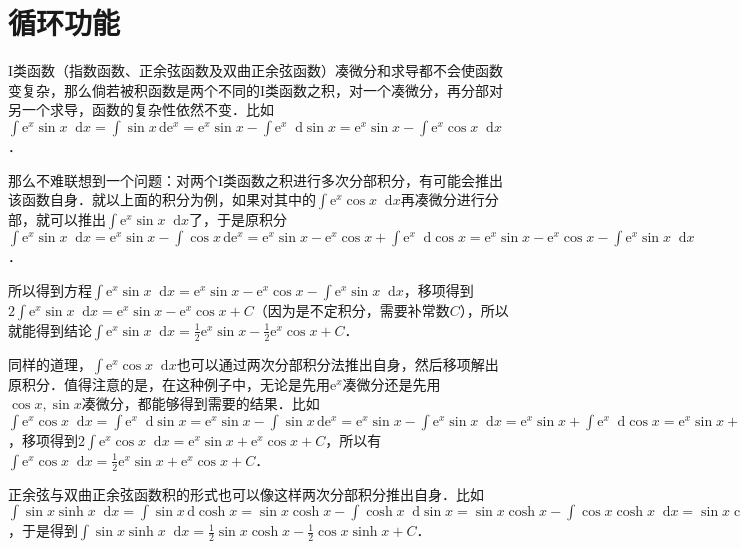 \documentclass{ctexbook}
\newcommand*{\dif}{\mathop{}\!\mathrm{d}}
\begin{document}
\section{循环功能}
I类函数（指数函数、正余弦函数及双曲正余弦函数）凑微分和求导都不会使函数变复杂，那么倘若被积函数是两个不同的I类函数之积，对一个凑微分，再分部对另一个求导，函数的复杂性依然不变．比如$\int\mathrm{e}^{x}\sin{x}\dif{x}=\int\sin{x}\,\mathrm{d}\mathrm{e}^{x}=\mathrm{e}^{x}\sin{x}-\int\mathrm{e}^{x}\dif{\sin{x}}=\mathrm{e}^{x}\sin{x}-\int\mathrm{e}^{x}\cos{x}\dif{x}$．\par
那么不难联想到一个问题：对两个I类函数之积进行多次分部积分，有可能会推出该函数自身．就以上面的积分为例，如果对其中的$\int\mathrm{e}^{x}\cos{x}\dif{x}$再凑微分进行分部，就可以推出$\int\mathrm{e}^{x}\sin{x}\dif{x}$了，于是原积分$\int\mathrm{e}^{x}\sin{x}\dif{x}=\mathrm{e}^{x}\sin{x}-\int\cos{x}\,\mathrm{d}\mathrm{e}^{x}=\mathrm{e}^{x}\sin{x}-\mathrm{e}^{x}\cos{x}+\int\mathrm{e}^{x}\dif{\cos{x}}=\mathrm{e}^{x}\sin{x}-\mathrm{e}^{x}\cos{x}-\int\mathrm{e}^{x}\sin{x}\dif{x}$．\par
所以得到方程$\int\mathrm{e}^{x}\sin{x}\dif{x}=\mathrm{e}^{x}\sin{x}-\mathrm{e}^{x}\cos{x}-\int\mathrm{e}^{x}\sin{x}\dif{x}$，移项得到$2\int\mathrm{e}^{x}\sin{x}\dif{x}=\mathrm{e}^{x}\sin{x}-\mathrm{e}^{x}\cos{x}+C$（因为是不定积分，需要补常数$C$），所以就能得到结论$\int\mathrm{e}^{x}\sin{x}\dif{x}=\frac{1}{2}\mathrm{e}^{x}\sin{x}-\frac{1}{2}\mathrm{e}^{x}\cos{x}+C$．\par
同样的道理，$\int\mathrm{e}^{x}\cos{x}\dif{x}$也可以通过两次分部积分法推出自身，然后移项解出原积分．值得注意的是，在这种例子中，无论是先用$\mathrm{e}^{x}$凑微分还是先用$\cos{x},\sin{x}$凑微分，都能够得到需要的结果．比如$\int\mathrm{e}^{x}\cos{x}\dif{x}=\int\mathrm{e}^{x}\dif{\sin{x}}=\mathrm{e}^{x}\sin{x}-\int\sin{x}\,\mathrm{d}\mathrm{e}^{x}=\mathrm{e}^{x}\sin{x}-\int\mathrm{e}^{x}\sin{x}\dif{x}=\mathrm{e}^{x}\sin{x}+\int\mathrm{e}^{x}\dif{\cos{x}}=\mathrm{e}^{x}\sin{x}+\mathrm{e}^{x}\cos{x}-\int\cos{x}\,\mathrm{d}\mathrm{e}^{x}=\mathrm{e}^{x}\sin{x}+\mathrm{e}^{x}\cos{x}-\int\mathrm{e}^{x}\cos{x}$，移项得到$2\int\mathrm{e}^{x}\cos{x}\dif{x}=\mathrm{e}^{x}\sin{x}+\mathrm{e}^{x}\cos{x}+C$，所以有$\int\mathrm{e}^{x}\cos{x}\dif{x}=\frac{1}{2}\mathrm{e}^{x}\sin{x}+\mathrm{e}^{x}\cos{x}+C$．\par
正余弦与双曲正余弦函数积的形式也可以像这样两次分部积分推出自身．比如$\int\sin{x}\sinh{x}\dif{x}=\int\sin{x}\,\mathrm{d}\cosh{x}=\sin{x}\cosh{x}-\int\cosh{x}\dif{\sin{x}}=\sin{x}\cosh{x}-\int\cos{x}\cosh{x}\dif{x}=\sin{x}\cosh{x}-\int\cos{x}\,\mathrm{d}\sinh{x}=\sin{x}\cosh{x}-\cos{x}\sinh{x}+\int\sinh{x}\dif{\cos{x}}=\sin{x}\cosh{x}-\cos{x}\sinh{x}-\int\sin{x}\sinh{x}\dif{x}$，于是得到$\int\sin{x}\sinh{x}\dif{x}=\frac{1}{2}\sin{x}\cosh{x}-\frac{1}{2}\cos{x}\sinh{x}+C$．\par
\end{document}
